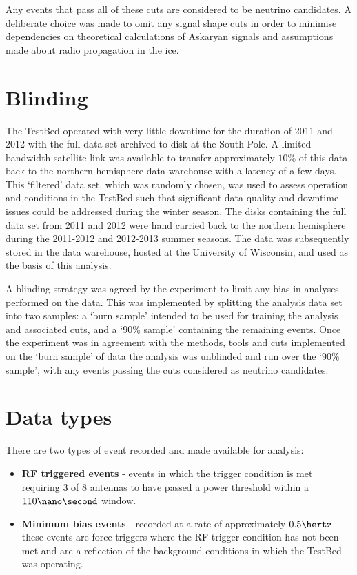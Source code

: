 Any events that pass all of these cuts are considered to be neutrino candidates. A deliberate choice was made to omit any signal shape cuts in order to minimise dependencies on theoretical calculations of Askaryan signals and assumptions made about radio propagation in the ice. 




\section{Blinding}
\label{sec:Analysis:Blinding}
The TestBed operated with very little downtime for the duration of 2011 and 2012 with the full data set archived to disk at the South Pole. A limited bandwidth satellite link was available to transfer approximately $10 \%$ of this data back to the northern hemisphere data warehouse with a latency of a few days. This `filtered' data set, which was randomly chosen, was used to assess operation and conditions in the TestBed such that significant data quality and downtime issues could be addressed during the winter season. The disks containing the full data set from 2011 and 2012 were hand carried back to the northern hemisphere during the 2011-2012 and 2012-2013 summer seasons. The data was subsequently stored in the data warehouse, hosted at the University of Wisconsin, and used as the basis of this analysis.

A blinding strategy was agreed by the experiment to limit any bias in analyses performed on the data. This was implemented by splitting the analysis data set into two samples: a `burn sample' intended to be used for training the analysis and associated cuts, and a `$90 \%$ sample' containing the remaining events. Once the experiment was in agreement with the methods, tools and cuts implemented on the `burn sample' of data the analysis was unblinded and run over the `$90 \%$ sample', with any events passing the cuts considered as neutrino candidates.

\section{Data types}
\label{sec:Analysis:Data-types}

There are two types of event recorded and made available for analysis:

\begin{itemize}

\item \textbf{RF triggered events} - events in which the trigger condition is met requiring 3 of 8 antennas to have passed a power threshold within a $110 \nano \second$ window.
\item \textbf{Minimum bias events} - recorded at a rate of approximately $0.5 \hertz$ these events are force triggers where the RF trigger condition has not been met and are a reflection of the background conditions in which the TestBed was operating.
\end{itemize}

